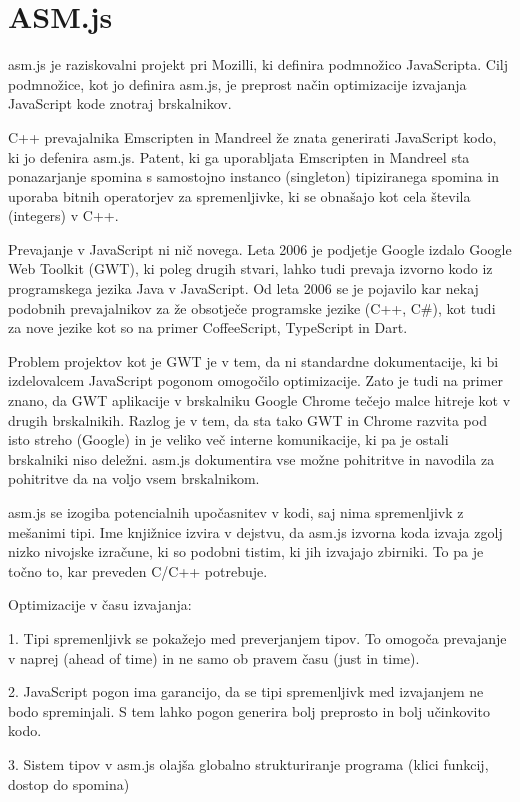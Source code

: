 \chapter{ASM.js}
\label{sec:asm}
asm.js je raziskovalni projekt pri Mozilli, ki definira podmnožico JavaScripta. Cilj podmnožice, kot jo definira asm.js, je preprost način optimizacije izvajanja JavaScript kode znotraj brskalnikov. 

C++ prevajalnika Emscripten in Mandreel že znata generirati JavaScript kodo, ki jo defenira asm.js. Patent, ki ga uporabljata Emscripten in Mandreel sta ponazarjanje spomina s samostojno instanco (singleton) tipiziranega spomina in uporaba bitnih operatorjev za spremenljivke, ki se obnašajo kot cela števila (integers) v C++.

Prevajanje v JavaScript ni nič novega. Leta 2006 je podjetje Google izdalo Google Web Toolkit (GWT), ki poleg drugih stvari, lahko  tudi prevaja izvorno kodo iz programskega jezika Java v JavaScript. Od leta 2006 se je pojavilo kar nekaj podobnih prevajalnikov za že obsotječe programske jezike (C++, C\#), kot tudi za nove jezike kot so na primer CoffeeScript, TypeScript in Dart.

Problem projektov kot je GWT je v tem, da ni standardne dokumentacije, ki bi izdelovalcem JavaScript pogonom omogočilo optimizacije. Zato je tudi na primer znano, da GWT aplikacije v brskalniku Google Chrome tečejo malce hitreje kot v drugih brskalnikih. Razlog je v tem, da sta tako GWT in Chrome razvita pod isto streho (Google) in je veliko več interne komunikacije, ki pa je ostali brskalniki niso deležni. asm.js dokumentira vse možne pohitritve in navodila za pohitritve da na voljo vsem brskalnikom.

asm.js se izogiba potencialnih upočasnitev v kodi, saj nima spremenljivk z mešanimi tipi. Ime knjižnice izvira v dejstvu, da asm.js izvorna koda izvaja zgolj nizko nivojske izračune, ki so podobni tistim, ki jih izvajajo zbirniki. To pa je točno to, kar preveden C/C++ potrebuje.

Optimizacije v času izvajanja:

1. Tipi spremenljivk se pokažejo med preverjanjem tipov. To omogoča prevajanje v naprej (ahead of time) in ne samo ob pravem času (just in time).

2. JavaScript pogon ima garancijo, da se tipi spremenljivk med izvajanjem ne bodo spreminjali. S tem lahko pogon generira bolj preprosto in bolj učinkovito kodo.

3. Sistem tipov v asm.js olajša globalno strukturiranje programa (klici funkcij, dostop do spomina)

